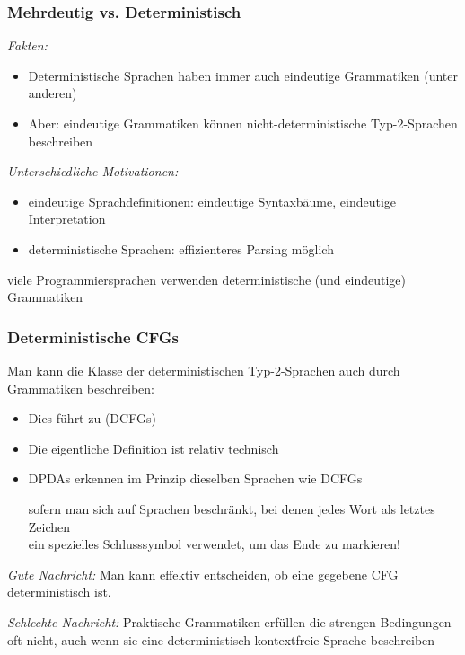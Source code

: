 \documentclass[aspectratio=1610,onlymath]{beamer}
\begin{document}
\begin{frame}\frametitle{Mehrdeutig vs. Deterministisch}

\emph{Fakten:}
\begin{itemize}
\item Deterministische Sprachen haben immer auch eindeutige Grammatiken (unter anderen)
\item Aber: eindeutige Grammatiken können nicht-deterministische Typ-2-Sprachen beschreiben
\end{itemize}
\bigskip\pause

\emph{Unterschiedliche Motivationen:}
\begin{itemize}
\item eindeutige Sprachdefinitionen: eindeutige Syntaxbäume, eindeutige Interpretation
\item deterministische Sprachen: effizienteres Parsing möglich
\end{itemize}
\alert{viele Programmiersprachen verwenden deterministische (und eindeutige) Grammatiken}

\end{frame}

\begin{frame}\frametitle{Deterministische CFGs}

Man kann die Klasse der deterministischen Typ-2-Sprachen auch durch Grammatiken
beschreiben:
\begin{itemize}
\item Dies führt zu  (DCFGs)
\item Die eigentliche Definition ist relativ technisch
\item DPDAs erkennen \alert{im Prinzip} dieselben Sprachen wie DCFGs\\[0.5ex]
{\tiny sofern man sich auf Sprachen beschränkt, bei denen
jedes Wort als letztes Zeichen\\ ein spezielles Schlusssymbol verwendet, um das Ende zu markieren!

}
\end{itemize}\pause

\emph{Gute Nachricht:} Man kann effektiv entscheiden, ob eine gegebene CFG deterministisch ist.\pause
\medskip

\emph{Schlechte Nachricht:} Praktische Grammatiken erfüllen die strengen Bedingungen oft nicht, auch wenn sie eine
deterministisch kontextfreie Sprache beschreiben

\end{frame}
\end{document}
